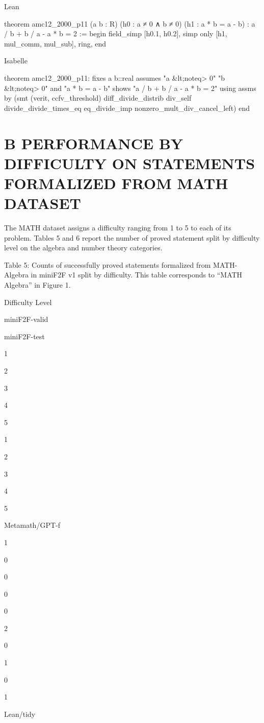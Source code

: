 \documentclass[
]{article}
\begin{document}
Lean

theorem amc12\_2000\_p11 (a b : R) (h0 : a ≠ 0 ∧ b ≠ 0) (h1 : a * b = a
- b) : a / b + b / a - a * b = 2 := begin field\_simp {[}h0.1, h0.2{]},
simp only {[}h1, mul\_comm, mul\_sub{]}, ring, end

Isabelle

theorem amc12\_2000\_p11: fixes a b::real assumes "a
\&lt;noteq\textgreater{} 0" "b \&lt;noteq\textgreater{} 0" and "a * b =
a - b" shows "a / b + b / a - a * b = 2" using assms by (smt (verit,
ccfv\_threshold) diff\_divide\_distrib div\_self
divide\_divide\_times\_eq eq\_divide\_imp
nonzero\_mult\_div\_cancel\_left) end

\section{B PERFORMANCE BY DIFFICULTY ON STATEMENTS FORMALIZED FROM MATH
DATASET}\label{b-performance-by-difficulty-on-statements-formalized-from-math-dataset}

The MATH dataset assigns a difficulty ranging from 1 to 5 to each of its
problem. Tables 5 and 6 report the number of proved statement split by
difficulty level on the algebra and number theory categories.

Table 5: Counts of successfully proved statements formalized from
MATH-Algebra in miniF2F v1 split by difficulty. This table corresponds
to ``MATH Algebra'' in Figure 1.

Difficulty Level

miniF2F-valid

miniF2F-test

1

2

3

4

5

1

2

3

4

5

Metamath/GPT-f

1

0

0

0

0

2

0

1

0

1

Lean/tidy
\end{document}
